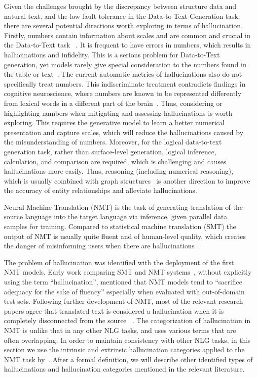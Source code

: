 Given the challenges brought by the discrepancy between structure data and natural text, and the low fault tolerance in the Data-to-Text Generation task, there are several potential directions worth exploring in terms of hallucination. 
Firstly, numbers contain information about scales and are common and crucial in the Data-to-Text task ~.
It is frequent to have errors in numbers, which results in hallucinations and infidelity. 
This is a serious problem for Data-to-Text generation, yet models rarely give special consideration to the numbers found in the table or text~. The current automatic metrics of hallucinations also do not specifically treat numbers. 
This indiscriminate treatment contradicts findings in cognitive neuroscience, where numbers are known to be represented differently from lexical words in a different part of the brain~.
Thus, considering or highlighting numbers when mitigating and assessing hallucinations is worth exploring. This requires the generative model to learn a better numerical presentation and capture scales, which will reduce the hallucinations caused by the misunderstanding of numbers. 
Moreover, for the logical data-to-text generation task, rather than surface-level generation, logical inference, calculation, and comparison are required, which is challenging and causes hallucinations more easily.   
Thus, reasoning (including numerical reasoning), which is usually combined with graph structures~ is another direction to improve the accuracy of entity relationships and alleviate hallucinations.

\label{section:translation}
Neural Machine Translation (NMT) is the task of generating translation of the source language into the target language via inference, given parallel data samples for training. Compared to statistical machine translation (SMT) the output of NMT is usually quite fluent and of human-level quality, which creates the danger of misinforming users when there are hallucinations~.

The problem of hallucination was identified with the deployment of the first NMT models. Early work comparing SMT and NMT systems~, without explicitly using the term “hallucination”, mentioned that NMT models tend to “sacrifice adequacy for the sake of fluency” especially when evaluated with out-of-domain test sets. Following further development of NMT, most of the relevant research papers agree that translated text is considered a hallucination when it is completely disconnected from the source ~. 
  The categorization of hallucination in NMT is unlike that in any other NLG tasks, and uses various terms that are often overlapping. In order to maintain consistency with other NLG tasks, in this section we use the intrinsic and extrinsic hallucination categories applied to the NMT task by~. After a formal definition, we will describe other identified types of hallucinations and hallucination categories mentioned in the relevant literature.

